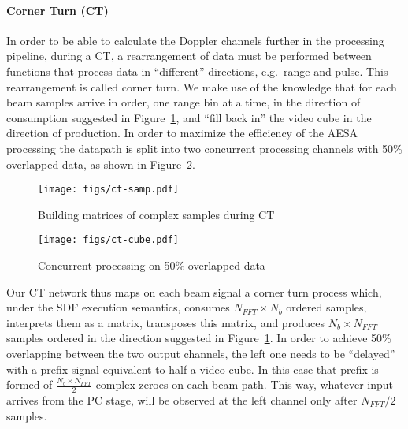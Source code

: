 \documentclass[
  a4paper,
]{article}
\let\oldparagraph\paragraph
\renewcommand{\paragraph}[1]{\oldparagraph{#1}\mbox{}}
\begin{document}
\hypertarget{sec:ct-atom}{%
\paragraph{Corner Turn (CT)}\label{sec:ct-atom}}

In order to be able to calculate the Doppler channels further in the
processing pipeline, during a CT, a rearrangement of data must be
performed between functions that process data in ``different''
directions, e.g.~range and pulse. This rearrangement is called corner
turn. We make use of the knowledge that for each beam samples arrive in
order, one range bin at a time, in the direction of consumption
suggested in Figure~\ref{fig:ct-samp}, and ``fill back in'' the video
cube in the direction of production. In order to maximize the efficiency
of the AESA processing the datapath is split into two concurrent
processing channels with 50\% overlapped data, as shown in
Figure~\ref{fig:ct-cube}.

\begin{figure}
\hypertarget{fig:ct-samp}{%
\centering
\texttt{[image: figs/ct-samp.pdf]}
\caption{Building matrices of complex samples during
CT}\label{fig:ct-samp}
}
\end{figure}

\begin{figure}
\hypertarget{fig:ct-cube}{%
\centering
\texttt{[image: figs/ct-cube.pdf]}
\caption{Concurrent processing on 50\% overlapped
data}\label{fig:ct-cube}
}
\end{figure}

Our CT network thus maps on each beam signal a corner turn process
which, under the SDF execution semantics, consumes \(N_{FFT}\times N_b\)
ordered samples, interprets them as a matrix, transposes this matrix,
and produces \(N_b\times N_{FFT}\) samples ordered in the direction
suggested in Figure~\ref{fig:ct-samp}. In order to achieve 50\%
overlapping between the two output channels, the left one needs to be
``delayed'' with a prefix signal equivalent to half a video cube. In
this case that prefix is formed of \(\frac{N_b \times N_{FFT}}{2}\)
complex zeroes on each beam path. This way, whatever input arrives from
the PC stage, will be observed at the left channel only after
\(N_{FFT}/2\) samples.
\end{document}
